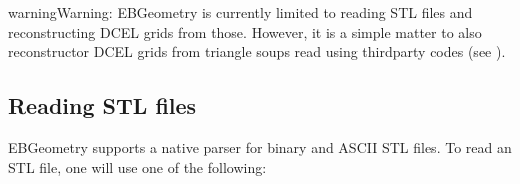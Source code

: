 \documentclass[letterpaper,10pt,english]{sphinxmanual}
\begin{document}
\begin{sphinxadmonition}{warning}{Warning:}
\sphinxAtStartPar
EBGeometry is currently limited to reading STL files and reconstructing DCEL grids from those.
However, it is a simple matter to also reconstructor DCEL grids from triangle soups read using third\sphinxhyphen{}party codes (see {\hyperref[\detokenize{Parsers:chap-thirdpartyparser}]{}}).
\end{sphinxadmonition}


\subsection{Reading STL files}
\label{\detokenize{Parsers:reading-stl-files}}
\sphinxAtStartPar
EBGeometry supports a native parser for binary and ASCII STL files.
To read an STL file, one will use one of the following:

\begin{sphinxVerbatim}[commandchars=\\\{\}]

\end{sphinxVerbatim}
\end{document}
